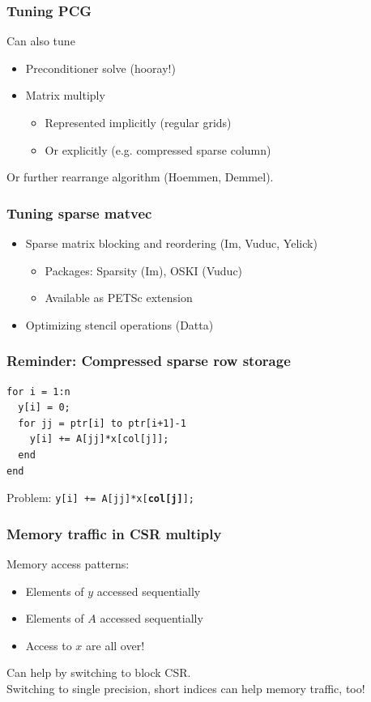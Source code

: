 \documentclass{beamer}
\begin{document}
\begin{frame}[fragile]
  \frametitle{Tuning PCG}
  
  Can also tune
  \begin{itemize}
  \item Preconditioner solve (hooray!)
  \item Matrix multiply
    \begin{itemize}
    \item Represented implicitly (regular grids)
    \item Or explicitly (e.g. compressed sparse column)
    \end{itemize}
  \end{itemize}
  Or further rearrange algorithm (Hoemmen, Demmel).
\end{frame}

\begin{frame}
  \frametitle{Tuning sparse matvec}

  \begin{itemize}
  \item Sparse matrix blocking and reordering (Im, Vuduc, Yelick)
    \begin{itemize}
    \item Packages: Sparsity (Im), OSKI (Vuduc)
    \item Available as PETSc extension
    \end{itemize}
  \item Optimizing stencil operations (Datta)
  \end{itemize}
\end{frame}


\begin{frame}[fragile]
  \frametitle{Reminder: Compressed sparse row storage}

  \begin{center}
    
  \end{center}

\begin{lstlisting}
for i = 1:n
  y[i] = 0;
  for jj = ptr[i] to ptr[i+1]-1
    y[i] += A[jj]*x[col[j]];
  end
end
\end{lstlisting}
Problem: {\tt y[i] += A[jj]*x[{\bf \color{red}col[j]}];}

\end{frame}


\begin{frame}
  \frametitle{Memory traffic in CSR multiply}

  Memory access patterns:
  \begin{itemize}
  \item Elements of $y$ accessed sequentially
  \item Elements of $A$ accessed sequentially
  \item Access to $x$ are all over!
  \end{itemize}
  Can help by switching to block CSR. \\
  Switching to single precision, short indices can help 
  memory traffic, too!
\end{frame}
\end{document}
